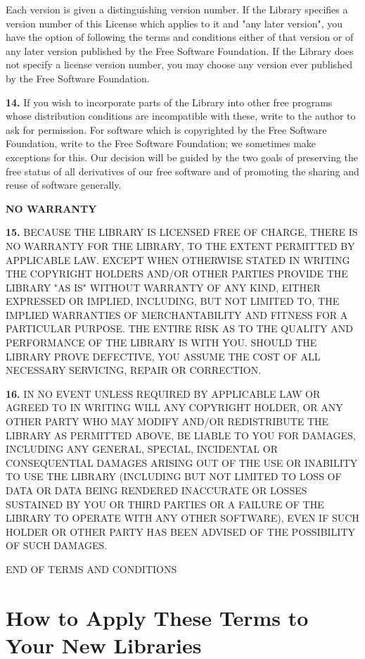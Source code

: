 Each version is given a distinguishing version number. If the Library
specifies a version number of this License which applies to it and "any later
version", you have the option of following the terms and conditions either of
that version or of any later version published by the Free Software
Foundation. If the Library does not specify a license version number, you may
choose any version ever published by the Free Software Foundation.

{\bf 14.} If you wish to incorporate parts of the Library into other free
programs whose distribution conditions are incompatible with these, write to
the author to ask for permission. For software which is copyrighted by the
Free Software Foundation, write to the Free Software Foundation; we sometimes
make exceptions for this. Our decision will be guided by the two goals of
preserving the free status of all derivatives of our free software and of
promoting the sharing and reuse of software generally.

{\bf NO WARRANTY}

{\bf 15.} BECAUSE THE LIBRARY IS LICENSED FREE OF CHARGE, THERE IS NO WARRANTY
FOR THE LIBRARY, TO THE EXTENT PERMITTED BY APPLICABLE LAW. EXCEPT WHEN
OTHERWISE STATED IN WRITING THE COPYRIGHT HOLDERS AND/OR OTHER PARTIES PROVIDE
THE LIBRARY "AS IS" WITHOUT WARRANTY OF ANY KIND, EITHER EXPRESSED OR
IMPLIED, INCLUDING, BUT NOT LIMITED TO, THE IMPLIED WARRANTIES OF
MERCHANTABILITY AND FITNESS FOR A PARTICULAR PURPOSE. THE ENTIRE RISK AS TO
THE QUALITY AND PERFORMANCE OF THE LIBRARY IS WITH YOU. SHOULD THE LIBRARY
PROVE DEFECTIVE, YOU ASSUME THE COST OF ALL NECESSARY SERVICING, REPAIR OR
CORRECTION.

{\bf 16.} IN NO EVENT UNLESS REQUIRED BY APPLICABLE LAW OR AGREED TO IN
WRITING WILL ANY COPYRIGHT HOLDER, OR ANY OTHER PARTY WHO MAY MODIFY AND/OR
REDISTRIBUTE THE LIBRARY AS PERMITTED ABOVE, BE LIABLE TO YOU FOR DAMAGES,
INCLUDING ANY GENERAL, SPECIAL, INCIDENTAL OR CONSEQUENTIAL DAMAGES ARISING
OUT OF THE USE OR INABILITY TO USE THE LIBRARY (INCLUDING BUT NOT LIMITED TO
LOSS OF DATA OR DATA BEING RENDERED INACCURATE OR LOSSES SUSTAINED BY YOU OR
THIRD PARTIES OR A FAILURE OF THE LIBRARY TO OPERATE WITH ANY OTHER SOFTWARE),
EVEN IF SUCH HOLDER OR OTHER PARTY HAS BEEN ADVISED OF THE POSSIBILITY OF SUCH
DAMAGES.

END OF TERMS AND CONDITIONS

\section{How to Apply These Terms to Your New Libraries}
\label{SEC45}


